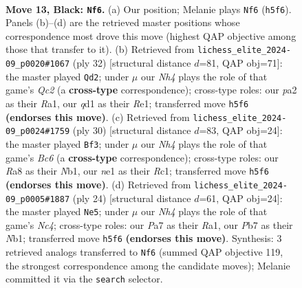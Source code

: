 \documentclass[11pt]{article}
\begin{document}
\clearpage

\begin{figure}[p]\centering
\begin{subfigure}{0.46\textwidth}\centering
\resizebox{\linewidth}{!}{%
\newchessgame
\chessboard[
  setfen={rnbq1rk1/pp3ppp/4p3/2P4n/2P5/3BP3/P4PPP/1RBQNRK1 b - - 4 13},
  showmover=false,
  pgfstyle=straightmove, color=movearrow, markmove={h5-f6}
]}
\caption{}
\end{subfigure}\hfill
\begin{subfigure}{0.46\textwidth}\centering
\resizebox{\linewidth}{!}{%
\newchessgame
\chessboard[
  setfen={r3rn2/ppqb1pk1/2p2ppp/8/3PN3/2PB3P/PPQ2PP1/R3R1K1 w - - 6 17},
  showmover=false,
  pgfstyle=straightmove, color=movearrow, markmove={c2-d2}
]}
\caption{}
\end{subfigure}
\\[4pt]
\begin{subfigure}{0.46\textwidth}\centering
\resizebox{\linewidth}{!}{%
\newchessgame
\chessboard[
  setfen={2b2rk1/2r1bppp/pqB2n2/1p2p3/8/1P2P3/PB2QPPP/RNR3K1 w - - 3 16},
  showmover=false,
  pgfstyle=straightmove, color=movearrow, markmove={c6-f3}
]}
\caption{}
\end{subfigure}\hfill
\begin{subfigure}{0.46\textwidth}\centering
\resizebox{\linewidth}{!}{%
\newchessgame
\chessboard[
  setfen={r1bq1rk1/pp2bppp/1np1p3/8/2NP1P2/4P3/PP3PBP/RN1Q1RK1 w - - 1 13},
  showmover=false,
  pgfstyle=straightmove, color=movearrow, markmove={c4-e5}
]}
\caption{}
\end{subfigure}
\caption{\textbf{Move 13, Black: \texttt{Nf6}.} (a) Our position; Melanie plays \texttt{Nf6} (\texttt{h5f6}). Panels (b)--(d) are the retrieved master positions whose correspondence most drove this move (highest QAP objective among those that transfer to it). (b) Retrieved from \texttt{lichess\_elite\_2024-09\_p0020\#1067} (ply 32) [structural distance $d$=81, QAP obj=71]: the master played \texttt{Qd2}; under $\mu$ our \emph{Nh4} plays the role of that game's \emph{Qc2} (a \textbf{cross-type} correspondence); cross-type roles: our \emph{p}a2 as their \emph{R}a1, our \emph{q}d1 as their \emph{R}e1; transferred move \texttt{h5f6} \textbf{(endorses this move)}. (c) Retrieved from \texttt{lichess\_elite\_2024-09\_p0024\#1759} (ply 30) [structural distance $d$=83, QAP obj=24]: the master played \texttt{Bf3}; under $\mu$ our \emph{Nh4} plays the role of that game's \emph{Bc6} (a \textbf{cross-type} correspondence); cross-type roles: our \emph{R}a8 as their \emph{N}b1, our \emph{n}e1 as their \emph{R}c1; transferred move \texttt{h5f6} \textbf{(endorses this move)}. (d) Retrieved from \texttt{lichess\_elite\_2024-09\_p0005\#1887} (ply 24) [structural distance $d$=61, QAP obj=24]: the master played \texttt{Ne5}; under $\mu$ our \emph{Nh4} plays the role of that game's \emph{Nc4}; cross-type roles: our \emph{P}a7 as their \emph{R}a1, our \emph{P}b7 as their \emph{N}b1; transferred move \texttt{h5f6} \textbf{(endorses this move)}. Synthesis: 3 retrieved analogs transferred to \texttt{Nf6} (summed QAP objective 119, the strongest correspondence among the candidate moves); Melanie committed it via the \texttt{search} selector.}
\label{fig:thought-m25}
\end{figure}
\end{document}
